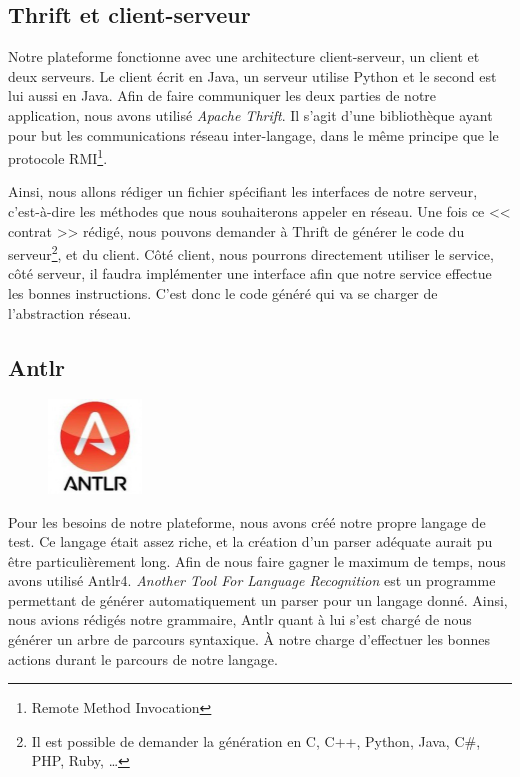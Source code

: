 \subsection{Thrift et client-serveur}
Notre plateforme fonctionne avec une architecture client-serveur, un client et deux serveurs. Le client écrit en Java, un serveur utilise
Python et le second est lui aussi en Java. Afin de faire communiquer les deux parties de notre application, nous avons utilisé \textit{Apache Thrift}. Il s'agit d'une bibliothèque ayant pour but les communications réseau inter-langage, dans le même principe que le protocole RMI\footnote{Remote Method Invocation}.

Ainsi, nous allons rédiger un fichier spécifiant les interfaces de notre serveur, c'est-à-dire les méthodes que nous souhaiterons appeler en réseau. Une fois ce << contrat >> rédigé, nous pouvons demander à Thrift de générer le code du serveur\footnote{Il est possible de demander la génération en C, C++, Python, Java, C\#, PHP, Ruby, \ldots}, et du client. Côté client, nous pourrons directement utiliser le service, côté serveur, il faudra implémenter une interface afin que notre service effectue les bonnes instructions. C'est donc le code généré qui va se charger de l'abstraction réseau.

\subsection{Antlr}
\begin{figure}
	\includegraphics[width=2.5cm]{contents/images/antlr.jpg}
\end{figure}
Pour les besoins de notre plateforme, nous avons créé notre propre langage de test. Ce langage était assez riche, et la création d'un parser adéquate aurait pu être particulièrement long. Afin de nous faire gagner le maximum de temps, nous avons utilisé Antlr4.  \textit{Another Tool For Language Recognition} est un programme permettant de générer automatiquement un parser pour un langage donné. Ainsi, nous avions rédigés notre grammaire, Antlr quant à lui s'est chargé de nous générer un arbre de parcours syntaxique. À notre charge d'effectuer les bonnes actions durant le parcours de notre langage.
\newpage
